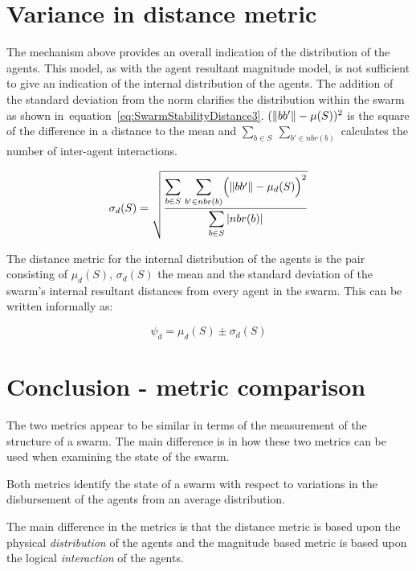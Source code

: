 \section{Variance in distance metric}\label{Section:VarianceInDistance}
The mechanism above provides an overall indication of the distribution of the agents. This model, as with the agent resultant magnitude model, is not sufficient to give an indication of the internal distribution of the agents. The addition of the standard deviation from the norm clarifies the distribution within the swarm as shown in~equation~\ref{eq:SwarmStabilityDistance3}. $(\Vert{bb'}\Vert - \mu(S))^2$ is the square of the difference in a distance to the mean and $\sum_{b \in S}~\sum_{b' \in nbr(b)}$ calculates the number of inter-agent interactions.

\begin{equation}
\label{eq:SwarmStabilityDistance3}
\sigma_d(S) = \sqrt{\frac{\mathlarger{\sum_{b \in S}}~\mathlarger{\sum_{b' \in nbr(b)}}\Big(\magn{bb'} - \mu_d(S)\Big)^2}{\mathlarger{\sum_{b \in S}\card{nbr(b)}}}}
\end{equation}

The distance metric for the internal distribution of the agents is the pair consisting of $\mu_d(S)$, $\sigma_d(S)$ the mean and the standard deviation of the swarm's internal resultant distances from every agent in the swarm. This can be written informally as:

\begin{equation}
\label{eq:SwarmPotentialMagnitude2}
\psi_d = \mu_d(S)\pm \sigma_d(S)
\end{equation}

\section{Conclusion - metric comparison\label{metric:MagnitudeDistanceComparison}}
The two metrics appear to be similar in terms of the measurement of the structure of a swarm. The main difference is in how these two metrics can be used when examining the state of the swarm.

Both metrics identify the state of a swarm with respect to variations in the disbursement of the agents from an average distribution. 

The main difference in the metrics is that the distance metric is based upon the physical \textit{distribution} of the agents and the magnitude based metric is based upon the logical \textit{interaction} of the agents.

